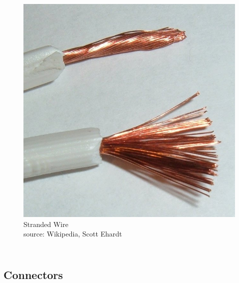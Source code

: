 \documentclass{beamer}
\begin{document}
\begin{frame}
\begin{columns}[t]
\begin{figure}
  \centering
  \includegraphics[width=1.0\columnwidth]{images-dis3/stranded_lamp_wire} \\
  Stranded Wire \\
  {\tiny source: Wikipedia, Scott Ehardt}
\end{figure}
\end{columns}
\end{frame}

\subsection{Connectors}
\end{document}
